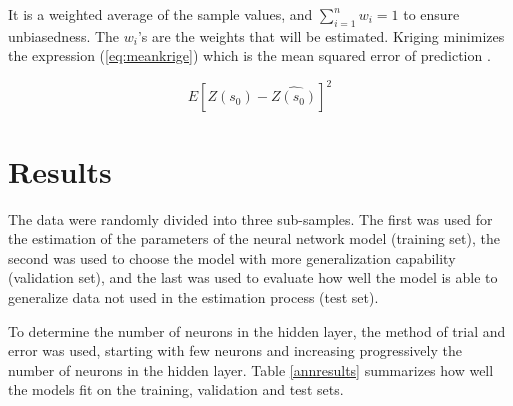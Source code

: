 \documentclass[11pt,twoside]{rmta2010esp}%
\begin{document}
It is a weighted average of the sample values, and $ \sum_{i=1}^{n} w_{i} = 1 $ to ensure unbiasedness. The $w_{i}$'s are the weights that will be estimated. Kriging minimizes the expression (\ref{eq:meankrige}) which is the mean squared error of prediction \cite{nicolas2015}. 

\begin{equation}
 E\left[Z(s_{0}) - \hat{Z(s_{0})}\right]^{2}
\label{eq:meankrige}
\end{equation}  



\section{Results}
The data were randomly divided into three sub-samples. The first was used for the
estimation of the parameters of the neural network model (training set), the second was used to choose the model with more generalization capability (validation set), and the last was
used to evaluate how well the model is able to generalize data not used in the estimation process (test set). 

To determine the number of neurons in the hidden layer, the method of trial and error was used, starting with few neurons and increasing progressively the number of neurons in the hidden layer. Table \ref{annresults}
summarizes how well the models fit on the training, validation and test sets.
\end{document}
